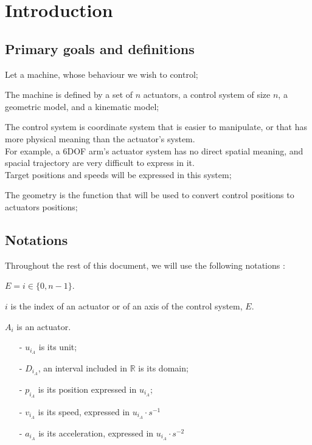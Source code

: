\newpage

\section{Introduction}


\subsection{Primary goals and definitions}

Let a machine, whose behaviour we wish to control;\newline

The machine is defined by a set of $n$ actuators, a control system of size $n$, a geometric model, and a kinematic
model;\newline

The control system is coordinate system that is easier to manipulate, or that has more physical meaning than the
actuator's system.\\
For example, a 6DOF arm's actuator system has no direct spatial meaning, and spacial trajectory are very difficult
to express in it.\\
Target positions and speeds will be expressed in this system;\newline

The geometry is the function that will be used to convert control positions to actuators positions;


\subsection{Notations}

Throughout the rest of this document, we will use the following notations :\newline

$E = {i\in \{0, n-1\}}$.\newline

$i$ is the index of an actuator or of an axis of the control system, $E$.\newline

$A_i$ is an actuator.
\begin{itemize}
    \item[-] $u_{i_A}$ is its unit;
    \item[-] $D_{i_A}$, an interval included in $\mathbb{R}$ is its domain;
    \item[-] $p_{i_A}$ is its position expressed in $u_{i_A}$;
    \item[-] $v_{i_A}$ is its speed, expressed in $u_{i_A} \cdot s^{-1}$
    \item[-] $a_{i_A}$ is its acceleration, expressed in $u_{i_A} \cdot s^{-2}$\newline
\end{itemize}

